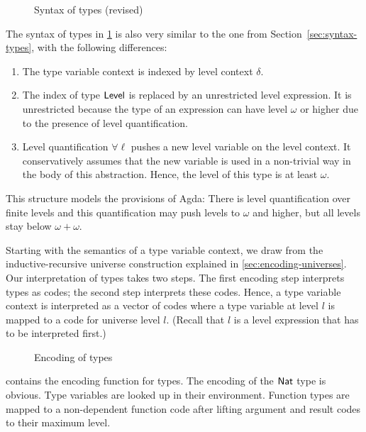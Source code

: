 \documentclass[manuscript,screen,review,anonymous]{acmart}
\begin{document}
\begin{minipage}{0.45\linewidth}
  \IRTEnv
\end{minipage}
\begin{minipage}{0.45\linewidth}
  \IRTEnvNi
\end{minipage}
\begin{figure}[tp]
  \IRType
  \caption{Syntax of types (revised)}
  \label{fig:ir-type-syntax}
\end{figure}

The syntax of types in \cref{fig:ir-type-syntax} is also very similar to the one from
Section~\ref{sec:syntax-types}, with the following differences:
\begin{enumerate}
\item The type variable context is indexed by level context $\delta$.
\item The index of type $\ALevel$ is replaced by an unrestricted level
  expression. It is unrestricted because the type of an expression can
  have level $\omega$ or higher due to the presence of level
  quantification.
\item Level quantification $\forall\ell$ pushes a new level variable on
  the level context. It conservatively assumes that the new variable
  is used in a non-trivial way in the body of this abstraction. Hence,
  the level of this type is at least $\omega$.
\end{enumerate}
This structure models the provisions of Agda: There is level
quantification over finite levels and this quantification may push
levels to $\omega$ and higher, but all levels stay below $\omega+\omega$.

Starting with the semantics of a type variable context, we draw from
the inductive-recursive universe construction explained in
\cref{sec:encoding-universes}. Our interpretation of
types takes two steps. The first encoding step interprets types as
codes; the second step interprets these codes. Hence, a type variable
context is interpreted as a vector of codes where a type variable at
level $l$ is mapped to a code for universe level $l$. (Recall that $l$
is a level expression that has to be interpreted first.)

\IRFTSEAsFunction

\begin{figure}[tp]
  \IRencode
  \caption{Encoding of types}
  \label{fig:ir-encoding-types}
\end{figure}
 contains the encoding function for types.
The encoding of the $\ANat$ type is obvious.  Type variables are
looked up in their environment. Function types are mapped to a
non-dependent function code after lifting argument and result codes to
their maximum level.
\end{document}
